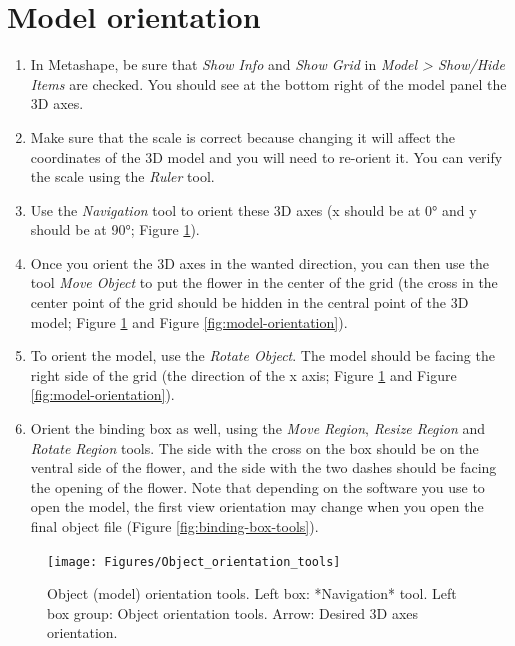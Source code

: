 \documentclass[
]{book}
\begin{document}
\hypertarget{model-orientation}{%
\section{Model orientation}\label{model-orientation}}

\begin{enumerate}
\def\labelenumi{\arabic{enumi}.}
\item
  In Metashape, be sure that \emph{Show Info} and \emph{Show Grid} in \emph{Model \textgreater{} Show/Hide Items}
  are checked. You should see at the bottom right of the model panel
  the 3D axes.
\item
  Make sure that the scale is correct because changing it will affect
  the coordinates of the 3D model and you will need to re-orient it. You can
  verify the scale using the \emph{Ruler} tool.
\item
  Use the \emph{Navigation} tool to orient these 3D axes (x should be at 0° and y should be at 90°; Figure \ref{fig:orientation-tools}).
\item
  Once you orient the 3D axes in the wanted direction, you can then
  use the tool \emph{Move Object} to put the flower in the
  center of the grid (the cross in the center point of the grid should be hidden
  in the central point of the 3D model; Figure \ref{fig:orientation-tools} and Figure \ref{fig:model-orientation}).
\item
  To orient the model, use the \emph{Rotate Object}. The model should be facing the right side of the grid (the direction
  of the x axis; Figure \ref{fig:orientation-tools} and Figure \ref{fig:model-orientation}).
\item
  Orient the binding box as well, using the \emph{Move Region}, \emph{Resize Region} and \emph{Rotate Region}
  tools. The side with the cross on the box should be on the ventral side of the
  flower, and the side with the two dashes should be facing the opening of the flower.
  Note that depending on the software you use to open the model, the first view
  orientation may change when you open the final object file (Figure \ref{fig:binding-box-tools}).
\end{enumerate}

\begin{figure}

{\centering \texttt{[image: Figures/Object\_orientation\_tools]} 

}

\caption{Object (model) orientation tools. Left box: *Navigation* tool. Left box group: Object orientation tools. Arrow: Desired 3D axes orientation.}\label{fig:orientation-tools}
\end{figure}
\end{document}
